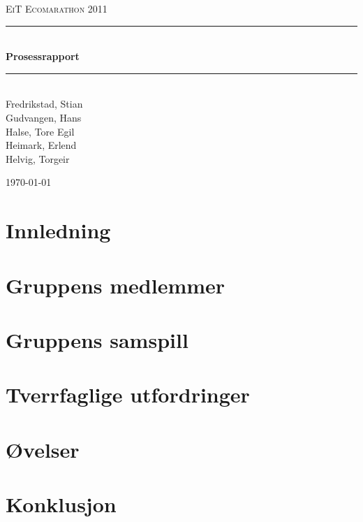 \documentclass[a4paper,11pt]{report}
\newcommand{\HRule}{\rule{\linewidth}{0.5mm}}
\begin{document}
\begin{titlepage}

\begin{center}
\textsc{\LARGE EiT Ecomarathon 2011}\\[1.5cm]

\HRule \\[0.4cm]
{ \huge \bfseries Prosessrapport}\\[0.4cm]
\HRule \\[1.5cm] 

Fredrikstad, Stian\\
Gudvangen, Hans\\
Halse, Tore Egil\\
Heimark, Erlend\\
Helvig, Torgeir\\

\vfill
 
{\large \today}

\end{center}
\end{titlepage}
\cleardoublepage
{}
\tableofcontents
\clearpage
\chapter{Innledning}

\chapter{Gruppens medlemmer}





\chapter{Gruppens samspill}




\chapter{Tverrfaglige utfordringer}

\chapter{Øvelser}

\chapter{Konklusjon}


\appendix



\clearpage 
\cite{dummy} %
 
 
\end{document}
